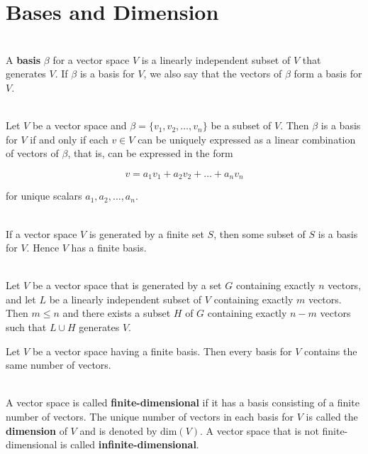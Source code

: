\section{Bases and Dimension}

\begin{definition}
	\hfill\\
	A \textbf{basis} $\beta$ for a vector space $V$ is a linearly independent subset of $V$ that generates $V$. If $\beta$ is a basis for $V$, we also say that the vectors of $\beta$ form a basis for $V$.
\end{definition}

\begin{theorem}
	\hfill\\
	Let $V$ be a vector space and $\beta = \{v_1, v_2, \dots, v_n\}$ be a subset of $V$. Then $\beta$ is a basis for $V$ if and only if each $v \in V$ can be uniquely expressed as a linear combination of vectors of $\beta$, that is, can be expressed in the form

	\[v = a_1v_1 + a_2v_2 + \dots + a_nv_n\]

	for unique scalars $a_1, a_2, \dots, a_n$.
\end{theorem}

\begin{theorem}
	\hfill\\
	If a vector space $V$ is generated by a finite set $S$, then some subset of $S$ is a basis for $V$. Hence $V$ has a finite basis.
\end{theorem}

\begin{theorem}
	\hfill\\
	Let $V$ be a vector space that is generated by a set $G$ containing exactly $n$ vectors, and let $L$ be a linearly independent subset of $V$ containing exactly $m$ vectors. Then $m \leq n$ and there exists a subset $H$ of $G$ containing exactly $n-m$ vectors such that $L \cup H$ generates $V$.
\end{theorem}

\begin{corollary}
	Let $V$ be a vector space having a finite basis. Then every basis for $V$ contains the same number of vectors.
\end{corollary}

\begin{definition}
	\hfill\\
	A vector space is called \textbf{finite-dimensional} if it has a basis consisting of a finite number of vectors. The unique number of vectors in each basis for $V$ is called the \textbf{dimension} of $V$ and is denoted by $\text{dim}(V)$. A vector space that is not finite-dimensional is called \textbf{infinite-dimensional}.
\end{definition}

